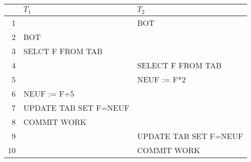 \documentclass{bschlangaul-aufgabe}
\begin{document}
\begin{center}
\begin{tabular}{|r|l|l|}
\hline
   & $T_1$                 & $T_2$                 \\\hline\hline
1  &                       & BOT                   \\\hline
2  & BOT                   &                       \\\hline
3  & SELCT F FROM TAB      &                       \\\hline
4  &                       & SELECT F FROM TAB     \\\hline
5  &                       & NEUF := F*2           \\\hline
6  & NEUF := F+5           &                       \\\hline
7  & UPDATE TAB SET F=NEUF &                       \\\hline
8  & COMMIT WORK           &                       \\\hline
9  &                       & UPDATE TAB SET F=NEUF \\\hline
10 &                       & COMMIT WORK           \\\hline
\end{tabular}
\end{center}
\end{document}
